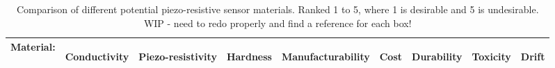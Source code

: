 \begin{table}[H]
		\centering
		\caption{Comparison of different potential piezo-resistive sensor materials. Ranked 1 to 5, where 1 is desirable and 5 is undesirable. WIP - need to redo properly and find a reference for each box!}
		\label{tab:comparing-piezo-r-materials}
		\vspace{3cm}
		\begin{tabular}{|p{2cm}|p{1cm}|p{1cm}|p{1cm}|p{1cm}|p{1cm}|p{1cm}|p{1cm}|p{1cm}|}
			\multicolumn{1}{l}{\textbf{Material:}} & \multicolumn{1}{c}{\begin{rotate}{60} \hspace{0.1cm}\vspace{-2cm} \textbf{Conductivity} \end{rotate}} & 
			\multicolumn{1}{c}{\begin{rotate}{60} \hspace{0.2cm}\vspace{-2cm} \textbf{Piezo-resistivity} \end{rotate}} & 
			\multicolumn{1}{c}{\begin{rotate}{60} \hspace{0.2cm}\vspace{-2cm} \textbf{Hardness} \end{rotate}} & 
			\multicolumn{1}{c}{\begin{rotate}{60} \hspace{0.2cm}\vspace{-2cm} \textbf{Manufacturability} \end{rotate}} & 
			\multicolumn{1}{c}{\begin{rotate}{60} \hspace{0.2cm}\vspace{-2cm} \textbf{Cost} \end{rotate}} & 
			\multicolumn{1}{c}{\begin{rotate}{60} \hspace{0.2cm}\vspace{-2cm} \textbf{Durability} \end{rotate}} & 
			\multicolumn{1}{c}{\begin{rotate}{60} \hspace{0.2cm}\vspace{-2cm} \textbf{Toxicity} \end{rotate}} & 
			\multicolumn{1}{c}{\begin{rotate}{60} \hspace{0.2cm}\vspace{-2cm} \textbf{Drift} \end{rotate}} \\ \hline
			

\end{tabular}
\end{table}

